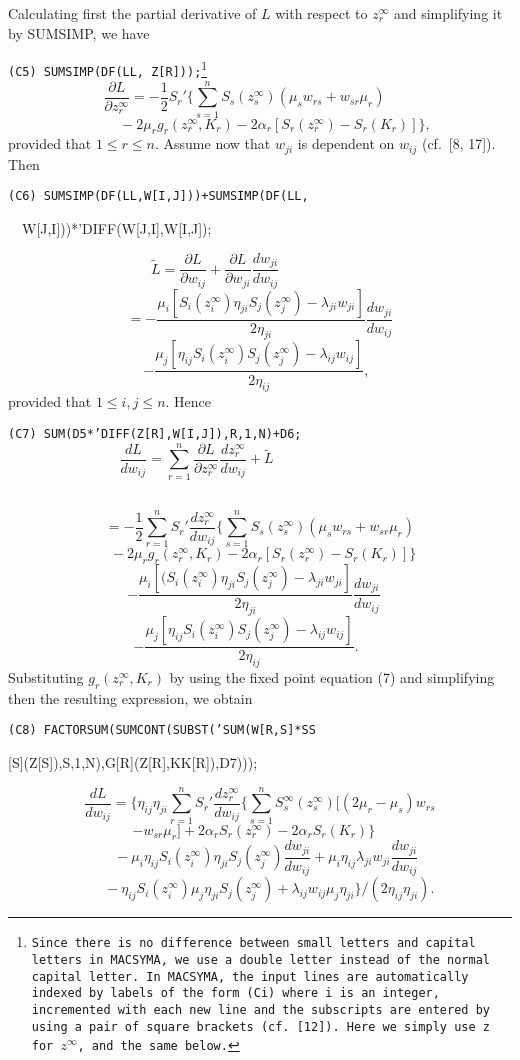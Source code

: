 Calculating first the partial derivative of $L$ with respect to 
$z_r^{\infty}$ and simplifying it by SUMSIMP, we have

\medskip
\noindent
{\tt (C5) SUMSIMP(DF(LL, Z[R]));\footnote{Since there is no 
difference between small letters and capital letters in MACSYMA, 
we use a double letter instead of the normal capital letter. 
In MACSYMA, the input lines are automatically indexed by labels
of the form {\tt (Ci)} where {\tt i} is an integer, incremented with
each new line and the subscripts are entered by using a pair 
of square brackets (cf.\ [12]). 
Here we simply use z for $z^{\infty}$, and the same 
below.}} 
\[\frac{\partial L}{\partial z_r^{\infty}}
=
-\frac{1}{2}S_r'\{\sum_{s=1}^nS_s(z_s^{\infty})(\mu_sw_{rs}+w_{sr}\mu_r)
~~~~~~~~~~\]
\[~~~~~~~~~~-2\mu_rg_r(z_r^{\infty},K_r)-2\alpha_r[S_r(z_r^{\infty})-S_r(K_r)]\},\]
provided that $1\leq r\leq n$.                          
Assume now that $w_{ji}$ is dependent on $w_{ij}$ (cf.\ [8, 17]). Then

\medskip
\noindent
{\tt (C6) SUMSIMP(DF(LL,W[I,J]))+SUMSIMP(DF(LL,

~~W[J,I]))*'DIFF(W[J,I],W[I,J]);} 
\[\tilde{L}=\frac{\partial L}{\partial w_{ij}}+
\frac{\partial L}{\partial w_{ji}}\frac{dw_{ji}}{dw_{ij}}~~~~~~
~~~~~~~~~~~~~~~~~~~~~~~\]
\[=-\frac{\mu_i[S_i(z_i^{\infty})\eta_{ji}S_j(z_j^{\infty})-\lambda_{ji}w_{ji}]
}{2\eta_{ji}}\frac{dw_{ji}}{dw_{ij}}\]
\[-\frac{\mu_j[\eta_{ij}S_i(z_i^{\infty})S_j(z_j^{\infty})-\lambda_{ij}w_{ij}]
}{2\eta_{ij}},~~\]
provided that $1\leq i, j\leq n$.
Hence

\medskip
\noindent
{\tt (C7) SUM(D5*'DIFF(Z[R],W[I,J]),R,1,N)+D6;
\[\frac{dL}{dw_{ij}}=\sum_{r=1}^n\frac{\partial L}{\partial
z_r^{\infty}}
\frac{dz_r^{\infty}}{dw_{ij}}+\tilde{L}
~~~~~~~~~~~~~~~~~~~~~~~~~~~~~~~~~~~~~~~~~\]                             

\[=-\frac{1}{2}\sum_{r=1}^nS_r'\frac{dz_r^{\infty}}{dw_{ij}}
\{\sum_{s=1}^nS_s(z_s^{\infty})(\mu_sw_{rs}+w_{sr}\mu_r)\]
\[~~-2\mu_rg_r(z_r^{\infty},K_r)
-2\alpha_r[S_r(z_r^{\infty})-S_r(K_r)]\}\]
\[-\frac{\mu_i[(S_i(z_i^{\infty})\eta_{ji}S_j(z_j^{\infty})-\lambda_{ji}w_{ji}]
}{2\eta_{ji}}\frac{dw_{ji}}{dw_{ij}}~~~~\]
\[-\frac{\mu_j[\eta_{ij}S_i(z_i^{\infty})S_j(z_j^{\infty})-\lambda_{ij}w_{ij}]
}{2\eta_{ij}}.~~~~~~~~~\]
Substituting $g_r(z_r^{\infty},K_r)$ by using the fixed point equation
(7) and 
simplifying then the resulting expression, we obtain

\medskip
\noindent
{\tt (C8) FACTORSUM(SUMCONT(SUBST('SUM(W[R,S]*SS}

[S](Z[S]),S,1,N),G[R](Z[R],KK[R]),D7)));} 
\[\frac{dL}{dw_{ij}}=
\{\eta_{ij}\eta_{ji}\sum_{r=1}^nS_r'\frac{dz_r^{\infty}}{dw_{ij}}
\{\sum_{s=1}^nS_s^{\infty}(z_s^{\infty})
[(2\mu_r-\mu_s)w_{rs}\]
\[-w_{sr}\mu_r]+2\alpha_rS_r(z_r^{\infty})-2\alpha_rS_r(K_r)\}~~~~\]
\[~~~~-\mu_i\eta_{ij}S_i(z_i^{\infty})
\eta_{ji}S_j(z_j^{\infty})\frac{dw_{ji}}{dw_{ij}}
+\mu_i\eta_{ij}\lambda_{ji}w_{ji}\frac{dw_{ji}}{dw_{ij}}\]
\[~~~~~~-\eta_{ij}S_i(z_i^{\infty})\mu_j\eta_{ji}S_j(z_j^{\infty})
+\lambda_{ij}w_{ij}\mu_j\eta_{ji}\}/(2\eta_{ij}\eta_{ji}).\]

